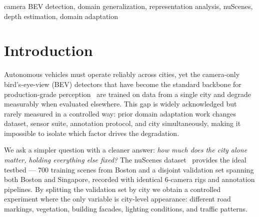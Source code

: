 \documentclass[letterpaper, 10pt, journal]{IEEEtran}
\begin{document}
\begin{abstract}
We systematically evaluate \textbf{six} adapter designs for injecting this stable
prior into a frozen BEVFormer and find all fail for principled, distinct reasons:
detection loss drives frozen adapters toward zero output (E3-A/B, replicated with
96-channel depth-scale-only injection in E6), simulated appearance augmentation does
not capture real city-level shift, partial encoder unfreezing degrades calibration of
the frozen detection head (NDS $-34\%$), and target-domain pseudo-label supervision
creates a self-referential optimization that reinforces source-domain biases, an
instance of the degenerate pseudo-labeling mode identified for 2D SFDA but here
manifesting in structured 3D box regression (E5: mAP $0.360$ vs.\ baseline $0.367$).
Our analysis identifies the specific conditions required for foundation depth priors
to improve camera BEV domain generalization, and provides a clean, reproducible
evaluation protocol for future work.
\end{abstract}

\begin{IEEEkeywords}
camera BEV detection, domain generalization, representation analysis,
nuScenes, depth estimation, domain adaptation
\end{IEEEkeywords}

\section{Introduction}
\label{sec:intro}

Autonomous vehicles must operate reliably across cities, yet the camera-only
bird's-eye-view (BEV) detectors that have become the standard backbone for
production-grade perception~\cite{li2022bevformer,li2023bevdepth,wang2023streampetr}
are trained on data from a single city and degrade measurably when evaluated elsewhere.
This gap is widely acknowledged but rarely measured in a controlled way: prior
domain adaptation work changes dataset, sensor suite, annotation protocol, and city
simultaneously, making it impossible to isolate which factor drives the degradation.

We ask a simpler question with a cleaner answer: \emph{how much does the city alone
matter, holding everything else fixed?}
The nuScenes dataset~\cite{caesar2020nuscenes} provides the ideal testbed --- 700
training scenes from Boston and a disjoint validation set spanning both Boston and
Singapore, recorded with identical 6-camera rigs and annotation pipelines.
By splitting the validation set by city we obtain a controlled experiment where
the only variable is city-level appearance: different road markings, vegetation,
building facades, lighting conditions, and traffic patterns.
\end{document}
